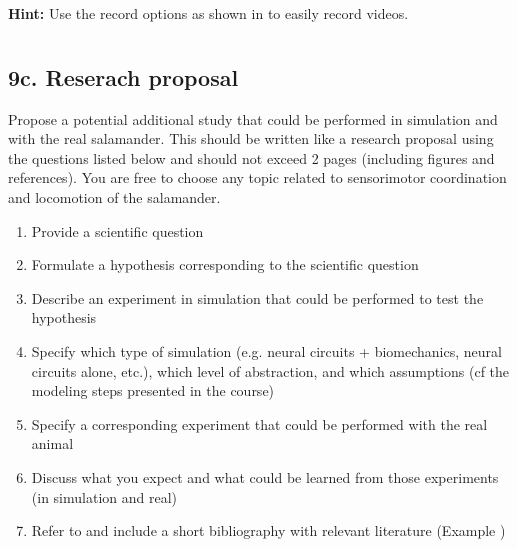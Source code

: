 \documentclass{cmc}
\begin{document}
\textbf{Hint:} Use the record options as shown in  to
easily record videos.



\section*{}
\subsection*{9c. Reserach proposal}

Propose a potential additional study that could be performed
  in simulation and with the real salamander.  This should be written
  like a research proposal using the questions listed below and should not exceed
  2 pages (including figures and references). You are free to choose
  any topic related to sensorimotor coordination and locomotion of the
  salamander. 

\begin{enumerate}
\item Provide a scientific question
\item Formulate a hypothesis corresponding to the scientific question
\item Describe an experiment in simulation that could be
  performed to test the hypothesis
\item Specify which type of simulation (e.g. neural circuits +
  biomechanics, neural circuits alone, etc.), which level of
  abstraction, and which assumptions (cf the modeling steps presented
  in the course)
\item Specify a corresponding experiment that could be performed
  with the real animal
\item Discuss what you expect and what could be learned from
  those experiments (in simulation and real)
\item Refer to and include a short bibliography with relevant
  literature (Example \cite{ijspeert2007swimming})
\end{enumerate}





\label{sec:references}


\end{document}
